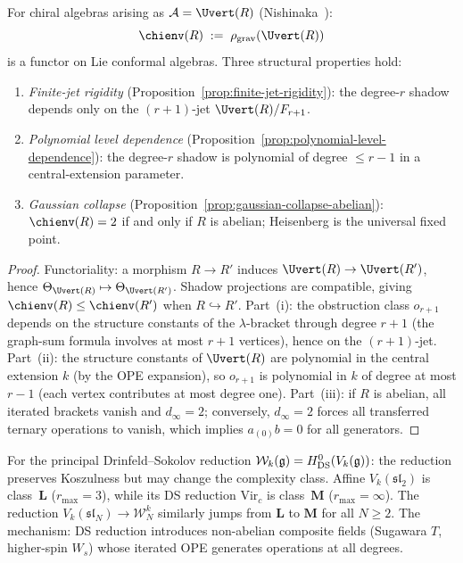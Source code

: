 \begin{proposition}
\label{prop:thqg-complexity-functor}
\ClaimStatusProvedHere
{}
For chiral algebras arising as $\cA = \Uvert(R)$
\textup{(}Nishinaka~\cite{Nish26}\textup{)}:
\begin{equation}\label{eq:thqg-chienv}
\chienv(R)
\;:=\;
\rho_{\mathrm{grav}}(\Uvert(R))
\end{equation}
is a functor on Lie conformal algebras. Three structural
properties hold:
\begin{enumerate}[label=\textup{(\roman*)}]
\item \emph{Finite-jet rigidity}
 \textup{(}Proposition~\ref{prop:finite-jet-rigidity}\textup{)}:
 the degree-$r$ shadow depends only on the $(r{+}1)$-jet
 $\Uvert(R)/F_{r+1}$.
\item \emph{Polynomial level dependence}
 \textup{(}Proposition~\ref{prop:polynomial-level-dependence}\textup{)}:
 the degree-$r$ shadow is polynomial of degree $\leq r{-}1$ in
 a central-extension parameter.
\item \emph{Gaussian collapse}
 \textup{(}Proposition~\ref{prop:gaussian-collapse-abelian}\textup{)}:
 $\chienv(R) = 2$ if and only if $R$ is abelian; Heisenberg is
 the universal fixed point.
\end{enumerate}
\end{proposition}

\begin{proof}
Functoriality: a morphism $R \to R'$ induces
$\Uvert(R) \to \Uvert(R')$, hence
$\Theta_{\Uvert(R)} \mapsto \Theta_{\Uvert(R')}$.
Shadow projections are compatible, giving
$\chienv(R) \leq \chienv(R')$ when $R \hookrightarrow R'$.
Part~(i): the obstruction class $o_{r+1}$ depends on
the structure constants of the $\lambda$-bracket through
degree $r+1$ (the graph-sum formula involves at most $r+1$
vertices), hence on the $(r{+}1)$-jet.
Part~(ii): the structure constants of $\Uvert(R)$ are polynomial
in the central extension $k$ (by the OPE expansion), so
$o_{r+1}$ is polynomial in $k$ of degree at most $r-1$
(each vertex contributes at most degree one).
Part~(iii): if $R$ is abelian, all iterated brackets vanish
and $d_\infty = 2$; conversely, $d_\infty = 2$ forces
all transferred ternary operations to vanish, which implies
$a_{(0)}b = 0$ for all generators.
\end{proof}

\begin{remark}
\label{rem:thqg-ds-complexity}
For the principal Drinfeld--Sokolov reduction
$\mathcal{W}_k(\mathfrak{g}) = H^0_{\mathrm{DS}}(V_k(\mathfrak{g}))$:
the reduction preserves Koszulness but may change the
complexity class. Affine $V_k(\mathfrak{sl}_2)$ is
class~$\mathbf{L}$ ($r_{\max} = 3$), while its DS reduction
$\mathrm{Vir}_c$ is class~$\mathbf{M}$ ($r_{\max} = \infty$).
The reduction $V_k(\mathfrak{sl}_N) \to \mathcal{W}_N^k$
similarly jumps from $\mathbf{L}$ to $\mathbf{M}$ for
all $N \geq 2$. The mechanism: DS reduction introduces
non-abelian composite fields (Sugawara $T$, higher-spin
$W_s$) whose iterated OPE generates operations at all
degrees.
\end{remark}


